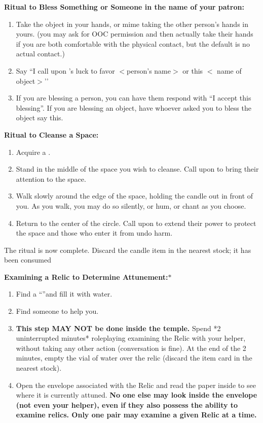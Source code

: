 \documentclass[green]{GL2020}
\begin{document}
\textbf{Ritual to Bless Something or Someone in the name of your patron:}
  \begin{enumerate}
    \item Take the object in your hands, or mime taking the other person’s hands in yours. (you may ask for OOC permission and then actually take their hands if you are both comfortable with the physical contact, but the default is no actual contact.)
    \item Say ``I call upon \cGenesis{}’s luck to favor $<$person’s name$>$ or this $<$ name of object$>$’’
    \item If you are blessing a person, you can have them respond with ``I accept this blessing''. If you are blessing an object, have whoever asked you to bless the object say this.
  \end{enumerate}

\textbf{Ritual to Cleanse a Space:}
  \begin{enumerate}
    \item Acquire a \iRitualCandle{}.
    \item Stand in the middle of the space you wish to cleanse. Call upon \cGenesis{} to bring their attention to the space.
    \item Walk slowly around the edge of the space, holding the candle out in front of you. As you walk, you may do so silently, or hum, or chant as you choose.
    \item Return to the center of the circle. Call upon \cGenesis{} to extend their power to protect the space and those who enter it from undo harm.
  \end{enumerate}
The ritual is now complete. Discard the candle item in the nearest stock; it has been consumed
   
\textbf{Examining a Relic to Determine Attunement:}$*$
  \begin{enumerate}
    \item Find a ``\iGlassVial{}''and fill it with water.
		\item Find someone to help you.
    \item \textbf{This step MAY NOT be done inside the temple.} Spend *2 uninterrupted minutes* roleplaying examining the Relic with your helper, without taking any other action (conversation is fine). At the end of the 2 minutes, empty the vial of water over the relic (discard the item card in the nearest stock). 
    \item Open the envelope associated with the Relic and read the paper inside to see where it is currently attuned. \textbf{No one else may look inside the envelope (not even your helper), even if they also possess the ability to examine relics. Only one pair may examine a given Relic at a time.}
  \end{enumerate}
   
\end{document}

